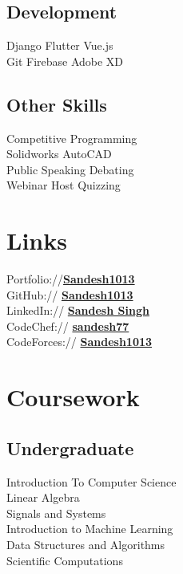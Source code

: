 \documentclass[]{deedy-resume-openfont}
\begin{document}
\begin{minipage}[t]{0.30\textwidth}
\subsection{Development}
\textbullet{} Django \textbullet{} Flutter \textbullet{}  Vue.js  \\
\textbullet{} Git \textbullet{} Firebase \textbullet{} Adobe XD \\
\sectionsep

\subsection{Other Skills}
\textbullet{} Competitive Programming \\
\textbullet{} Solidworks \textbullet{} AutoCAD \\
\textbullet{} Public Speaking \textbullet{} Debating  \\
\textbullet{} Webinar Host \textbullet{} Quizzing \\

\section{Links} 
Portfolio://\href{https://sandesh1013.github.io/MyPortfolio/}{\bf Sandesh1013 \faExternalLink}\\
GitHub:// \href{https://github.com/Sandesh1013}{\bf Sandesh1013 \faExternalLink}\\
LinkedIn://  \href{https://www.linkedin.com/in/sandesh-singh-1596281a0/}{\bf Sandesh Singh \faExternalLink} \\
CodeChef:// \href{https://www.codechef.com/users/sandesh77}{\bf sandesh77 \faExternalLink} \\
CodeForces:// \href{https://codeforces.com/profile/Sandesh1013}{\bf Sandesh1013 \faExternalLink} \\


\section{Coursework}
\subsection{Undergraduate}
Introduction To Computer Science \\
Linear Algebra \\
Signals and Systems\\
Introduction to Machine Learning\\
Data Structures and Algorithms\\
Scientific Computations \\

\end{minipage}
\end{document}
